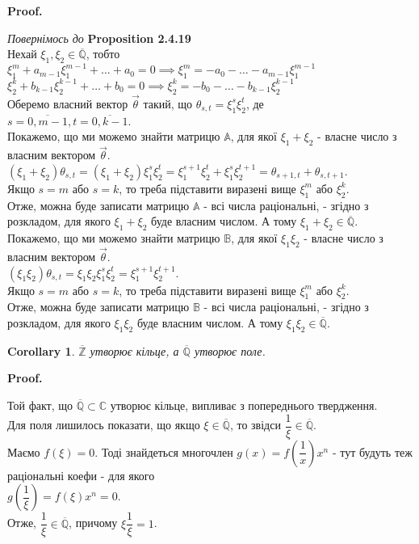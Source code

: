 \documentclass[a4paper, 14pt]{extarticle}
\makeatletter
\theoremstyle{theoremdd}
\theoremstyle{theoremdd}
\theoremstyle{theoremdd}
\theoremstyle{theoremdd}
\theoremstyle{theoremdd}
\theoremstyle{theoremdd}
\theoremstyle{theoremdd}
\theoremstyle{theoremdd}
\newtheorem{corollary}[theorem]{Corollary}
\def\qed{$\blacksquare$}
\renewenvironment{proof}[1][Proof.\\]{\par
\pushQED{\hfill \qed}%
\normalfont \topsep6\p@\@plus6\p@\relax
\trivlist
\item\relax
{\bfseries
#1\@addpunct{.}}\hspace\labelsep\ignorespaces
}{%
\popQED\endtrivlist\@endpefalse
}
\makeatother
\begin{document}
\begin{proof}
\textit{Повернімось до} \textbf{Proposition 2.4.19}\\
Нехай $\xi_1,\xi_2 \in \overline{\mathbb{Q}}$, тобто\\
$\xi_1^m + a_{m-1}\xi_1^{m-1} + \dots + a_0 = 0 \implies \xi_1^m = -a_0 - \dots - a_{m-1}\xi_1^{m-1}$\\
$\xi_2^k + b_{k-1}\xi_2^{k-1} + \dots + b_0 = 0 \implies \xi_2^k = -b_0 - \dots - b_{k-1} \xi_2^{k-1}$\\
Оберемо власний вектор $\vec{\theta}$ такий, що $\theta_{s,t} = \xi_1^s \xi_2^t$, де \\ $s = \overline{0,m-1}, t = \overline{0,k-1}$.\\
Покажемо, що ми можемо знайти матрицю $\mathbb{A}$, для якої $\xi_1+\xi_2$ - власне число з власним вектором $\vec{\theta}$.\\
$(\xi_1+\xi_2) \theta_{s,t} = (\xi_1+\xi_2) \xi_1^s \xi_2^t = \xi_1^{s+1} \xi_2^t + \xi_1^s \xi_2^{t+1} = \theta_{s+1,t} + \theta_{s,t+1}$.\\
Якщо $s = m$ або $s = k$, то треба підставити виразені вище $\xi_1^m$ або $\xi_2^k$.\\
Отже, можна буде записати матрицю $\mathbb{A}$ - всі числа раціональні, - згідно з розкладом, для якого $\xi_1+\xi_2$ буде власним числом. А тому $\xi_1+\xi_2 \in \overline{\mathbb{Q}}$.
\bigskip \\
Покажемо, що ми можемо знайти матрицю $\mathbb{B}$, для якої $\xi_1\xi_2$ - власне число з власним вектором $\vec{\theta}$.\\
$(\xi_1\xi_2) \theta_{s,t} = \xi_1\xi_2 \xi_1^s \xi_2^t = \xi_1^{s+1}\xi_2^{t+1}$.\\
Якщо $s = m$ або $s = k$, то треба підставити виразені вище $\xi_1^m$ або $\xi_2^k$.\\
Отже, можна буде записати матрицю $\mathbb{B}$ - всі числа раціональні, - згідно з розкладом, для якого $\xi_1\xi_2$ буде власним числом. А тому $\xi_1 \xi_2 \in \overline{\mathbb{Q}}$.
\end{proof}

\begin{corollary}
$\overline{\mathbb{Z}}$ утворює кільце, а $\overline{\mathbb{Q}}$ утворює поле.
\end{corollary}

\begin{proof}
Той факт, що $\overline{\mathbb{Q}} \subset \mathbb{C}$ утворює кільце, випливає з попереднього твердження.\\
Для поля лишилось показати, що якщо $\xi \in \overline{\mathbb{Q}}$, то звідси $\dfrac{1}{\xi} \in \overline{\mathbb{Q}}$.\\
Маємо $f(\xi) = 0$. Тоді знайдеться многочлен $g(x) = f\left( \dfrac{1}{x}\right) x^n$ - тут будуть теж раціональні коефи - для якого\\
$g\left( \dfrac{1}{\xi} \right) = f(\xi) x^n = 0$.\\
Отже, $\dfrac{1}{\xi} \in \overline{\mathbb{Q}}$, причому $\xi \dfrac{1}{\xi} = 1$.
\end{proof}
\end{document}

